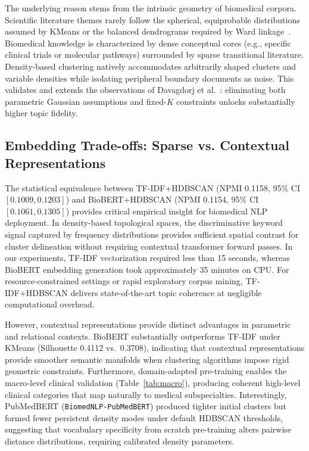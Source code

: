 \documentclass[a4paper,10pt,conference]{IEEEtran}
\begin{document}
The underlying reason stems from the intrinsic geometry of biomedical corpora. Scientific literature themes rarely follow the spherical, equiprobable distributions assumed by KMeans or the balanced dendrograms required by Ward linkage~\cite{ref25}. Biomedical knowledge is characterized by dense conceptual cores (e.g., specific clinical trials or molecular pathways) surrounded by sparse transitional literature. Density-based clustering natively accommodates arbitrarily shaped clusters and variable densities while isolating peripheral boundary documents as noise. This validates and extends the observations of Davagdorj et al.~\cite{ref15}: eliminating both parametric Gaussian assumptions and fixed-$K$ constraints unlocks substantially higher topic fidelity.

\subsection{Embedding Trade-offs: Sparse vs. Contextual Representations}

The statistical equivalence between TF-IDF+HDBSCAN (NPMI 0.1158, 95\% CI $[0.1009, 0.1203]$) and BioBERT+HDBSCAN (NPMI 0.1154, 95\% CI $[0.1061, 0.1305]$) provides critical empirical insight for biomedical NLP deployment. In density-based topological spaces, the discriminative keyword signal captured by frequency distributions provides sufficient spatial contrast for cluster delineation without requiring contextual transformer forward passes. In our experiments, TF-IDF vectorization required less than 15 seconds, whereas BioBERT embedding generation took approximately 35 minutes on CPU. For resource-constrained settings or rapid exploratory corpus mining, TF-IDF+HDBSCAN delivers state-of-the-art topic coherence at negligible computational overhead.

However, contextual representations provide distinct advantages in parametric and relational contexts. BioBERT substantially outperforms TF-IDF under KMeans (Silhouette 0.4112 vs.\ 0.3708), indicating that contextual representations provide smoother semantic manifolds when clustering algorithms impose rigid geometric constraints. Furthermore, domain-adapted pre-training enables the macro-level clinical validation (Table~\ref{tab:macro}), producing coherent high-level clinical categories that map naturally to medical subspecialties. Interestingly, PubMedBERT (\texttt{BiomedNLP-PubMedBERT}) produced tighter initial clusters but formed fewer persistent density modes under default HDBSCAN thresholds, suggesting that vocabulary specificity from scratch pre-training alters pairwise distance distributions, requiring calibrated density parameters.
\end{document}
